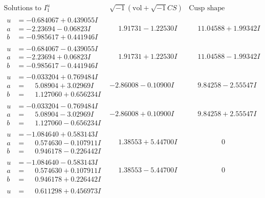 \documentclass[1p]{elsarticle_modified}
\theoremstyle{definition}
\newcommand{\I}{\sqrt{-1}}
\begin{document}
$$\begin{array}{c|c|c}
\text{Solutions to }I^u_{1}& \I (\text{vol} + \sqrt{-1}CS) & \text{Cusp shape}\\
 \hline 
\begin{aligned}
u &= -0.684067 + 0.439055 I \\
a &= -2.23694 - 0.06823 I \\
b &= -0.985617 + 0.441946 I\end{aligned}
 & \phantom{-}1.91731 - 1.22530 I & \phantom{-}11.04588 + 1.99342 I \\ \hline\begin{aligned}
u &= -0.684067 - 0.439055 I \\
a &= -2.23694 + 0.06823 I \\
b &= -0.985617 - 0.441946 I\end{aligned}
 & \phantom{-}1.91731 + 1.22530 I & \phantom{-}11.04588 - 1.99342 I \\ \hline\begin{aligned}
u &= -0.033204 + 0.769484 I \\
a &= \phantom{-}5.08904 + 3.02969 I \\
b &= \phantom{-}1.127060 + 0.656234 I\end{aligned}
 & -2.86008 - 0.10900 I & \phantom{-}9.84258 - 2.55547 I \\ \hline\begin{aligned}
u &= -0.033204 - 0.769484 I \\
a &= \phantom{-}5.08904 - 3.02969 I \\
b &= \phantom{-}1.127060 - 0.656234 I\end{aligned}
 & -2.86008 + 0.10900 I & \phantom{-}9.84258 + 2.55547 I \\ \hline\begin{aligned}
u &= -1.084640 + 0.583143 I \\
a &= \phantom{-}0.574630 - 0.107911 I \\
b &= \phantom{-}0.946178 - 0.226442 I\end{aligned}
 & \phantom{-}1.38553 + 5.44700 I & \phantom{-0.000000 } 0 \\ \hline\begin{aligned}
u &= -1.084640 - 0.583143 I \\
a &= \phantom{-}0.574630 + 0.107911 I \\
b &= \phantom{-}0.946178 + 0.226442 I\end{aligned}
 & \phantom{-}1.38553 - 5.44700 I & \phantom{-0.000000 } 0 \\ \hline\begin{aligned}
u &= \phantom{-}0.611298 + 0.456973 I \\

\end{aligned}
\end{array}$$
\end{document}
